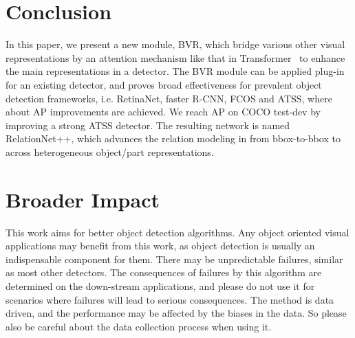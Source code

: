 \documentclass{article}
\begin{document}
\section{Conclusion}
\vspace{-3mm}
In this paper, we present a new module, BVR, which bridge various other visual representations by an attention mechanism like that in Transformer~\cite{vaswani2017attention} to enhance the main representations in a detector. The BVR module can be applied plug-in for an existing detector, and proves broad effectiveness for prevalent object detection frameworks, i.e. RetinaNet, faster R-CNN, FCOS and ATSS, where about  AP improvements are achieved. We reach  AP on COCO test-dev by improving a strong ATSS detector. The resulting network is named RelationNet++, which advances the relation modeling in \cite{hu2018relation} from bbox-to-bbox to across heterogeneous object/part representations. 
\newpage
\section*{Broader Impact}

This work aims for better object detection algorithms. Any object oriented visual applications may benefit from this work, as object detection is usually an indispensable component for them. There may be unpredictable failures, similar as most other detectors. The consequences of failures by this algorithm are determined on the down-stream applications, and please do not use it for scenarios where failures will lead to serious consequences. The method is data driven, and the performance may be affected by the biases in the data. So please also be careful about the data collection process when using it.




\end{document}
